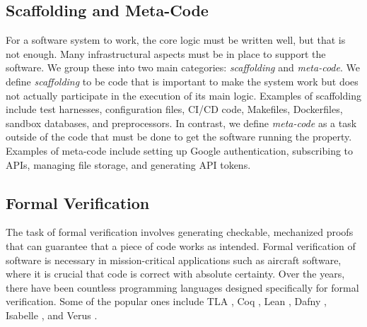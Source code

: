 
\vspace{-0.25cm}

\subsection{Scaffolding and Meta-Code} 
\vspace{-0.1cm}
\label{subsec:scaffolding-metacode}

For a software system to work, the core logic must be written well, but that is not enough. Many infrastructural aspects must be in place to support the software. We group these into two main categories: \textit{scaffolding} and \textit{meta-code}. We define \textit{scaffolding} to be code that is important to make the system work but does not actually participate in the execution of its main logic. Examples of scaffolding include test harnesses, configuration files, CI/CD code, Makefiles, Dockerfiles, sandbox databases, and preprocessors. In contrast, we define \textit{meta-code} as a task outside of the code that must be done to get the software running the property. Examples of meta-code include setting up Google authentication, subscribing to APIs, managing file storage, and generating API tokens.

\vspace{-0.25cm}

\subsection{Formal Verification}
\vspace{-0.1cm}

The task of formal verification involves generating checkable, mechanized proofs that can guarantee that a piece of code works as intended. Formal verification of software is necessary in mission-critical applications such as aircraft software, where it is crucial that code is correct with absolute certainty. Over the years, there have been countless programming languages designed specifically for formal verification. Some of the popular ones include TLA \citep{lamport1994introduction}, Coq \citep{Coq-refman}, Lean \citep{de2015lean}, Dafny \citep{leino2010dafny}, Isabelle \citep{nipkow2002isabelle}, and Verus \citep{lattuada2024verus}. 


